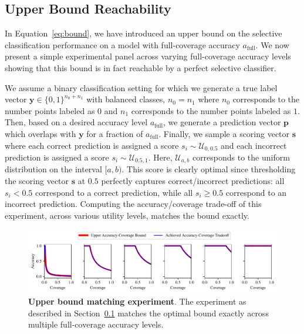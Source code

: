 \subsection{Upper Bound Reachability}
\label{sec:opt_bound_reach}

In Equation~\ref{eq:bound}, we have introduced an upper bound on the selective classification performance on a model with full-coverage accuracy $a_\text{full}$. We now present a simple experimental panel across varying full-coverage accuracy levels showing that this bound is in fact reachable by a perfect selective classifier.

We assume a binary classification setting for which we generate a true label vector $\bm{y} \in \{0,1\}^{n_0 + n_1}$ with balanced classes, \ie $n_0 = n_1$ where $n_0$ corresponds to the number points labeled as $0$ and $n_1$ corresponds to the number points labeled as $1$. Then, based on a desired accuracy level $a_\text{full}$, we generate a prediction vector $\bm{p}$ which overlaps with $\bm{y}$ for a fraction of $a_\text{full}$. Finally, we sample a  scoring vector $\bm{s}$ where each correct prediction is assigned a score $s_i \sim \mathcal{U}_{0,0.5}$ and each incorrect prediction is assigned a score $s_i \sim \mathcal{U}_{0.5,1}$. Here, $\mathcal{U}_{a,b}$ corresponds to the uniform distribution on the interval $[a,b)$. This score is clearly optimal since thresholding the scoring vector $\bm{s}$ at $0.5$ perfectly captures correct/incorrect predictions: all $s_i < 0.5$ correspond to a correct prediction, while all $s_i \geq 0.5$ correspond to an incorrect prediction. Computing the accuracy/coverage trade-off of this experiment, across various utility levels, matches the bound exactly. 

\begin{figure}[t]
  \centering
	    \includegraphics[width=\linewidth]{figs/sptd_dp/bound_reachability.pdf}

\caption[Upper bound matching experiment.]{\textbf{Upper bound matching experiment}. The experiment as described in Section~\ref{sec:opt_bound_reach} matches the optimal bound exactly across multiple full-coverage accuracy levels.}
\label{fig:bound_reachability}
\end{figure}